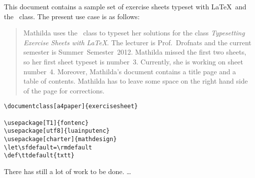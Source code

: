 \documentclass[a4paper]{exercisesheet}
\let\sfdefault=\rmdefault
\def\ttdefault{txtt}
\begin{document}
  \null \vfill

  This document contains a sample set of exercise sheets typeset with
  \LaTeX\ and the \exercisesheet\ class. The present use case is as
  follows:
  \begin{quote}
    Mathilda uses the \exercisesheet\ class to typeset her solutions
    for the class \emph{Typesetting Exercise Sheets with \LaTeX}. The
    lecturer is Prof.~Drofnats and the current semester is
    Summer~Semester~2012. Mathilda missed the first two sheets, so her
    first sheet typeset is number~3. Currently, she is working on
    sheet number~4. Moreover, Mathilda's document contains a title
    page and a table of contents. Mathilda has to leave some space on
    the right hand side of the page for corrections.
  \end{quote}

  \vfill \vfill

  \thispagestyle{empty}
  \setcounter{page}{0}
  \newpage
  
  \maketitle

  \tableofcontents

  \sheet[%
      number=3,
      topic={Using the \exercisesheet\ Class},
      deadline=Deadline: \today,
    ]

  \exercise[%
      topic=Setting up a Basic Template,
      credits=2
    ]

  \blindtext
  
  \begin{lstlisting}
\documentclass[a4paper]{exercisesheet}

\usepackage[T1]{fontenc}
\usepackage[utf8]{luainputenc}
\usepackage[charter]{mathdesign}
\let\sfdefault=\rmdefault
\def\ttdefault{txtt}
  \end{lstlisting}

  \blindtext

  \subexercise[%
      topic=The \lstinline|sheetconf| Command,
      credits=1
    ]
  
  \blindtext

  \exercise[%
      topic=More Stuff,
      credits=8
    ]

  \Blindtext

  \sheet[
      topic={Advanced Topics}
    ]

  There has still a lot of work to be done. \ldots
\end{document}
